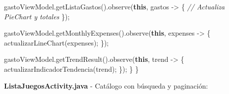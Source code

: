 \documentclass[
  spanish,
  11pt,
  paper=a4,
  ,captions=tableheading
]{scrartcl}
\newenvironment{Shaded}{}{}
\newcommand{\CommentTok}[1]{\textcolor[rgb]{0.38,0.63,0.69}{\textit{#1}}}
\newcommand{\FunctionTok}[1]{\textcolor[rgb]{0.02,0.16,0.49}{#1}}
\newcommand{\KeywordTok}[1]{\textcolor[rgb]{0.00,0.44,0.13}{\textbf{#1}}}
\newcommand{\NormalTok}[1]{#1}
\newcommand{\OperatorTok}[1]{\textcolor[rgb]{0.40,0.40,0.40}{#1}}
\begin{document}
\begin{Shaded}
\begin{Highlighting}[]
\NormalTok{        gastoViewModel}\OperatorTok{.}\FunctionTok{getListaGastos}\OperatorTok{().}\FunctionTok{observe}\OperatorTok{(}\KeywordTok{this}\OperatorTok{,}\NormalTok{ gastos }\OperatorTok{{-}\textgreater{}} \OperatorTok{\{}
            \CommentTok{// Actualiza PieChart y totales}
        \OperatorTok{\});}

\NormalTok{        gastoViewModel}\OperatorTok{.}\FunctionTok{getMonthlyExpenses}\OperatorTok{().}\FunctionTok{observe}\OperatorTok{(}\KeywordTok{this}\OperatorTok{,}\NormalTok{ expenses }\OperatorTok{{-}\textgreater{}} \OperatorTok{\{}
            \FunctionTok{actualizarLineChart}\OperatorTok{(}\NormalTok{expenses}\OperatorTok{);}
        \OperatorTok{\});}

\NormalTok{        gastoViewModel}\OperatorTok{.}\FunctionTok{getTrendResult}\OperatorTok{().}\FunctionTok{observe}\OperatorTok{(}\KeywordTok{this}\OperatorTok{,}\NormalTok{ trend }\OperatorTok{{-}\textgreater{}} \OperatorTok{\{}
            \FunctionTok{actualizarIndicadorTendencia}\OperatorTok{(}\NormalTok{trend}\OperatorTok{);}
        \OperatorTok{\});}
    \OperatorTok{\}}
\OperatorTok{\}}
\end{Highlighting}
\end{Shaded}

\textbf{ListaJuegosActivity.java} - Catálogo con búsqueda y paginación:
\end{document}
